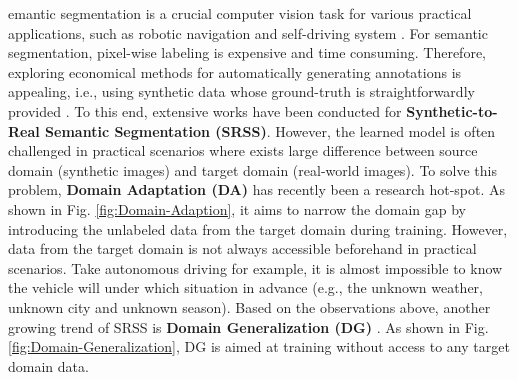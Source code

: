 \documentclass[twocolumn,journal,vlined,ruled,linesnumbered]{IEEEtran}
\begin{document}
emantic segmentation is a crucial computer vision
task for various practical applications, such as robotic navigation
and self-driving system \cite{zhang2019cascaded,long2015fully,chen2017deeplab,he2017mask}.
For semantic segmentation, pixel-wise labeling is
expensive and time consuming. Therefore, exploring economical methods
for automatically generating annotations is appealing, i.e., using
synthetic data whose ground-truth is straightforwardly provided \cite{handa2015scenenet,richter2016playing}.
To this end, extensive works have been conducted for \textbf{Synthetic-to-Real
Semantic Segmentation (SRSS)}. However, the learned model is often
challenged in practical scenarios where exists large difference between
source domain (synthetic images) and target domain (real-world images).
To solve this problem, \textbf{Domain Adaptation (DA)} \cite{hoffman2017cycada,hoffman2016fcns,zhang2017curriculum}\textbf{
}has recently been a research hot-spot. As shown in Fig. \ref{fig:Domain-Adaption},
it aims to narrow the domain gap by introducing the unlabeled data
from the target domain during training. However, data from the target
domain is not always accessible beforehand in practical scenarios.
Take autonomous driving for example, it is almost impossible to know
the vehicle will under which situation in advance (e.g., the unknown
weather, unknown city and unknown season). Based on the observations
above, another growing trend of SRSS is \textbf{Domain Generalization (DG)
}\cite{li2018learning,balaji2018metareg,ghifary2015domain,tobin2017domain}.
As shown in Fig. \ref{fig:Domain-Generalization}, DG is aimed at training without access to any target domain data.
\end{document}
